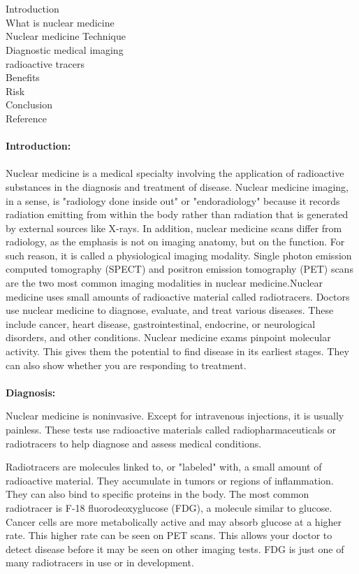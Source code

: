 \documentclass[12pt]{article}
\begin{document}
\\ \\Introduction \\ What is nuclear medicine \\ Nuclear medicine Technique \\Diagnostic medical imaging \\ radioactive tracers \\  Benefits \\ Risk \\ Conclusion \\ Reference \\ \\ \textbf{\large Introduction:} \\ \\ Nuclear medicine is a medical specialty involving the application of radioactive substances in the diagnosis and treatment of disease. Nuclear medicine imaging, in a sense, is "radiology done inside out" or "endoradiology" because it records radiation emitting from within the body rather than radiation that is generated by external sources like X-rays. In addition, nuclear medicine scans differ from radiology, as the emphasis is not on imaging anatomy, but on the function. For such reason, it is called a physiological imaging modality. Single photon emission computed tomography (SPECT) and positron emission tomography (PET) scans are the two most common imaging modalities in nuclear medicine.Nuclear medicine uses small amounts of radioactive material called radiotracers. Doctors use nuclear medicine to diagnose, evaluate, and treat various diseases. These include cancer, heart disease, gastrointestinal, endocrine, or neurological disorders, and other conditions. Nuclear medicine exams pinpoint molecular activity. This gives them the potential to find disease in its earliest stages. They can also show whether you are responding to treatment.
\\ \noindent
\\ \textbf{\large Diagnosis:}

\noindent Nuclear medicine is noninvasive. Except for intravenous injections, it is usually painless. These tests use radioactive materials called radiopharmaceuticals or radiotracers to help diagnose and assess medical conditions.

\noindent Radiotracers are molecules linked to, or "labeled" with, a small amount of radioactive material. They accumulate in tumors or regions of inflammation. They can also bind to specific proteins in the body. The most common radiotracer is F-18 fluorodeoxyglucose (FDG), a molecule similar to glucose. Cancer cells are more metabolically active and may absorb glucose at a higher rate. This higher rate can be seen on PET scans. This allows your doctor to detect disease before it may be seen on other imaging tests. FDG is just one of many radiotracers in use or in development.
\end{document}
